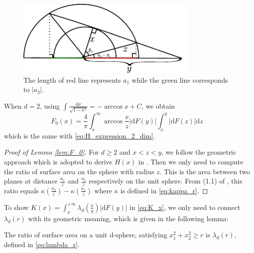 \documentclass{aptpub}
\def\d{\mathrm{d}}
\begin{document}
\begin{figure}[!ht]
     \centering
     \includegraphics[width=0.8\textwidth]{dessin.pdf}
     \caption{The length of red line represents $a_1$ while the green line corresponds to $|a_2|$.}
     \label{fig:a1a2}
\end{figure}
When $d=2$, using $\int \frac{\d x}{\sqrt{1-x^2}} = -\arccos x + C$,
we obtain
$$
F_0(x)=\frac{4}{\pi} \int_x^{\infty} \arccos\frac{x}{z}|\d F(y)|
\int_x^{y} |\d F(z)|\d z
$$
which is the same with \eqref{eq:H_expression_2_dim}.
\begin{proof}[Proof of Lemma \ref{lem:F_0}]
For $d\geq 2$ and $x<z<y$, we follow the geometric approach
which is adopted to derive
$H(x)$ in \cite{carnal1970konvexe}.
Then we only need to compute the ratio of surface area
on the sphere with radius $z$. This is the area between
two planes at distance $\frac{a_1}{z}$ and $\frac{a_2}{z}$
respectively on the unit sphere. From (1.1) of \cite{dwyer1991convex},
this ratio equals $\kappa(\frac{a_2}{z}) - \kappa(\frac{a_1}{z})$
where $\kappa$ is defined in \eqref{eq:kappa_r}.

\end{proof}
To show 
$K(x) = \int_x^{+\infty} \lambda_d(\frac{x}{y})|\d F(y)|$
in \eqref{eq:K_x},
we only need to connect $\lambda_d(r)$ with its geometric meaning,
which is given in the following lemma:
\begin{lemma}
     The ratio of surface area on a unit d-sphere,
     satisfying $x_1^2+x_2^2\geq r$ is $\lambda_d(r)$,
     defined in \eqref{eq:lambda_r}.
\end{lemma}
\end{document}
